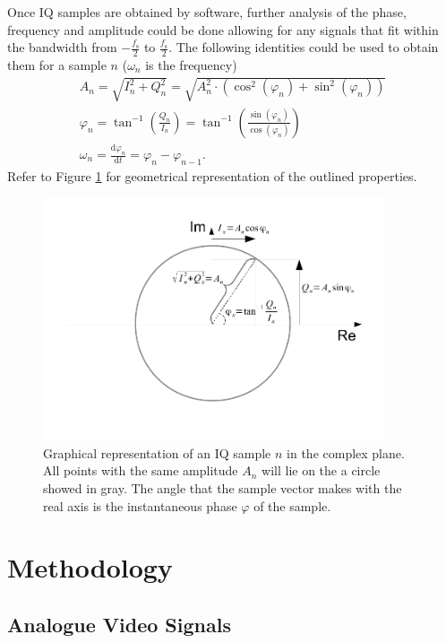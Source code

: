 \documentclass[a4paper,12pt,twoside,openright]{report}
\begin{document}
Once IQ samples are obtained by software, further analysis of the phase, frequency and amplitude could be done allowing for any signals that fit within the bandwidth from $-\frac{f_\text{s}}{2}$ to $\frac{f_\text{s}}{2}$. The following identities could be used to obtain them for a sample $n$ ($\omega_{n}$ is the frequency)
\begin{subequations}
\begin{align}
A_{n} = \sqrt{I_n^2+Q_n^2} = \sqrt{A_{n}^2 \cdot (\cos^2(\varphi_n) + \sin^2(\varphi_n))} \\
\varphi_{n} = \tan^{-1}\left(\frac{Q_{n}}{I_{n}}\right) = \tan^{-1}\left(\frac{\sin(\varphi_{n})}{\cos(\varphi_{n})}\right) \\
\omega_{n} = \frac{\text{d} \varphi_{n}}{\text{d} t} = \varphi_{n} - \varphi_{n-1} .
\end{align}
\end{subequations}
Refer to Figure \ref{fig:IQ} for geometrical representation of the outlined properties.

\begin{figure}
\centering
\includegraphics[width=0.9\textwidth]{iqdrawing}
  \caption{Graphical representation of an IQ sample $n$ in the complex plane. All points with the same amplitude $A_{n}$ will lie on the a circle showed in gray. The angle that the sample vector makes with the real axis is the instantaneous phase $\varphi$ of the sample.}
  \label{fig:IQ}
\end{figure}

\chapter{Methodology} 

\section{Analogue Video Signals}
\end{document}
